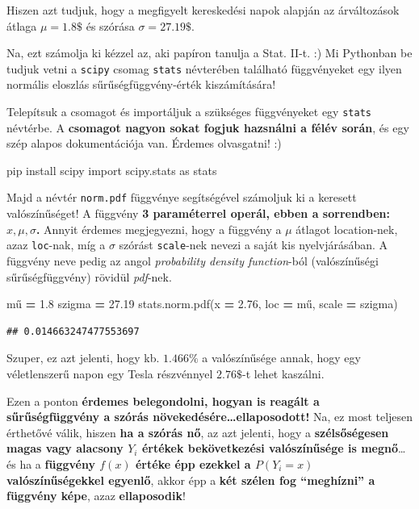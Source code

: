 \documentclass[
]{book}
\newenvironment{Shaded}{\begin{snugshade}}{\end{snugshade}}
\newcommand{\FloatTok}[1]{\textcolor[rgb]{0.00,0.00,0.81}{#1}}
\newcommand{\ImportTok}[1]{#1}
\newcommand{\NormalTok}[1]{#1}
\newcommand{\OperatorTok}[1]{\textcolor[rgb]{0.81,0.36,0.00}{\textbf{#1}}}
\begin{document}
Hiszen azt tudjuk, hogy a megfigyelt kereskedési napok alapján az árváltozások átlaga \(\mu=1.8\$\) és szórása \(\sigma=27.19\$\).

Na, ezt számolja ki kézzel az, aki papíron tanulja a Stat. II-t. :) Mi Pythonban be tudjuk vetni a \texttt{scipy} csomag \texttt{stats} névterében található függvényeket egy ilyen normális eloszlás sűrűségfüggvény-érték kiszámítására!

Telepítsuk a csomagot és importáljuk a szükséges függvényeket egy \texttt{stats} névtérbe. A \textbf{csomagot nagyon sokat fogjuk hazsnálni a félév során}, és egy szép alapos dokumentációja van. Érdemes olvasgatni! :)

\begin{Shaded}
\begin{Highlighting}[]
\NormalTok{pip install scipy}
\ImportTok{import}\NormalTok{ scipy.stats }\ImportTok{as}\NormalTok{ stats}
\end{Highlighting}
\end{Shaded}

Majd a névtér \texttt{norm.pdf} függvénye segítségével számoljuk ki a keresett valószínűséget! A függvény \textbf{3 paraméterrel operál, ebben a sorrendben: \(x, \mu, \sigma\).} Annyit érdemes megjegyezni, hogy a függvény a \(\mu\) átlagot location-nek, azaz \texttt{loc}-nak, míg a \(\sigma\) szórást \texttt{scale}-nek nevezi a saját kis nyelvjárásában. A függvény neve pedig az angol \emph{probability density function}-ból (valószínűségi sűrűségfüggvény) rövidül \emph{pdf}-nek.

\begin{Shaded}
\begin{Highlighting}[]
\NormalTok{mű }\OperatorTok{=} \FloatTok{1.8}
\NormalTok{szigma }\OperatorTok{=} \FloatTok{27.19}
\NormalTok{stats.norm.pdf(x }\OperatorTok{=} \FloatTok{2.76}\NormalTok{, loc }\OperatorTok{=}\NormalTok{ mű, scale }\OperatorTok{=}\NormalTok{ szigma)}
\end{Highlighting}
\end{Shaded}

\begin{verbatim}
## 0.014663247477553697
\end{verbatim}

Szuper, ez azt jelenti, hogy kb. \(1.466\%\) a valószínűsége annak, hogy egy véletlenszerű napon egy Tesla részvénnyel \(2.76\$\)-t lehet kaszálni.

Ezen a ponton \textbf{érdemes belegondolni, hogyan is reagált a sűrűségfüggvény a szórás növekedésére\ldots ellaposodott!} Na, ez most teljesen érthetővé válik, hiszen \textbf{ha a szórás nő}, az azt jelenti, hogy a \textbf{szélsőségesen magas vagy alacsony \(Y_i\) értékek bekövetkezési valószínűsége is megnő}\ldots és ha a \textbf{függvény \(f(x)\) értéke épp ezekkel a \(P(Y_i=x)\) valószínűségekkel egyenlő}, akkor épp a \textbf{két szélen fog ``meghízni'' a függvény képe}, azaz \textbf{ellaposodik}!
\end{document}
